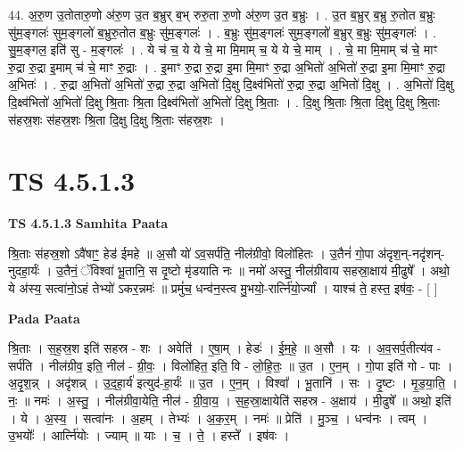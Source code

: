 \documentclass[17pt]{extarticle}
\begin{document}
44. अ॒रु॒ण उ॒तोतारु॒णो अ॑रु॒ण उ॒त ब॒भ्रुर् ब॒भ् रुरु॒ता रु॒णो अ॑रु॒ण उ॒त ब॒भ्रुः । . उ॒त ब॒भ्रुर् ब॒भ्रु रु॒तोत ब॒भ्रुः सु॑म॒ङ्गलः॑ सुम॒ङ्गलो॑ ब॒भ्रुरु॒तोत ब॒भ्रुः सु॑म॒ङ्गलः॑ । . ब॒भ्रुः सु॑म॒ङ्गलः॑ सुम॒ङ्गलो॑ ब॒भ्रुर् ब॒भ्रुः सु॑म॒ङ्गलः॑ । . सु॒म॒ङ्गल॒ इति॑ सु - म॒ङ्गलः॑ । . ये च॑ च॒ ये ये चे॒ मा मि॒माम् च॒ ये ये चे॒ माम् । . चे॒ मा मि॒माम् च॑ चे॒ माꣳ रु॒द्रा रु॒द्रा इ॒माम् च॑ चे॒ माꣳ रु॒द्राः । . इ॒माꣳ रु॒द्रा रु॒द्रा इ॒मा मि॒माꣳ रु॒द्रा अ॒भितो॑ अ॒भितो॑ रु॒द्रा इ॒मा मि॒माꣳ रु॒द्रा अ॒भितः॑ । . रु॒द्रा अ॒भितो॑ अ॒भितो॑ रु॒द्रा रु॒द्रा अ॒भितो॑ दि॒क्षु दि॒क्ष्व॑भितो॑ रु॒द्रा रु॒द्रा अ॒भितो॑ दि॒क्षु । . अ॒भितो॑ दि॒क्षु दि॒क्ष्व॑भितो॑ अ॒भितो॑ दि॒क्षु श्रि॒ताः श्रि॒ता दि॒क्ष्व॑भितो॑ अ॒भितो॑ दि॒क्षु श्रि॒ताः । . दि॒क्षु श्रि॒ताः श्रि॒ता दि॒क्षु दि॒क्षु श्रि॒ताः स॑हस्र॒शः स॑हस्र॒शः श्रि॒ता दि॒क्षु दि॒क्षु श्रि॒ताः स॑हस्र॒शः । \newline
\pagebreak
{}

\section{ TS 4.5.1.3 }

\textbf{TS 4.5.1.3 } \newline
\textbf{Samhita Paata} \newline

श्रि॒ताः स॑हस्र॒शो ऽवै॑षाꣳ॒॒ हेड॑ ईमहे ॥ अ॒सौ यो॑ ऽव॒सर्प॑ति॒ नील॑ग्रीवो॒ विलो॑हितः । उ॒तैनं॑ गो॒पा अ॑दृश॒न्-नदृ॑शन्-नुदहा॒र्यः॑ । उ॒तैनं॒ ॅविश्वा॑ भू॒तानि॒ स दृ॒ष्टो मृ॑डयाति नः ॥                               नमो॑ अस्तु॒ नील॑ग्रीवाय सहस्रा॒क्षाय॑ मी॒ढुषे᳚ । अथो॒ ये अ॑स्य॒ सत्वा॑नो॒ऽहं तेभ्यो॑ ऽकर॒न्नमः॑ ॥                                   प्रमुं॑च॒ धन्व॑न॒स्त्व मु॒भयो॒-रार्त्नि॑यो॒र्ज्यां । याश्च॑ ते॒ हस्त॒ इष॑वः॒ - [  ] \newline

\textbf{Pada Paata} \newline

श्रि॒ताः । स॒ह॒स्र॒श इति॑ सहस्र - शः । अवेति॑ । ए॒षा॒म् । हेडः॑ । ई॒म॒हे॒ ॥ अ॒सौ । यः । अ॒व॒सर्प॒तीत्य॑व - सर्प॑ति । नील॑ग्रीव॒ इति॒ नील॑ - ग्री॒वः॒ । विलो॑हित॒ इति॒ वि - लो॒हि॒तः॒ ॥ उ॒त । ए॒न॒म् । गो॒पा इति॑ गो - पाः । अ॒दृ॒श॒न्न् । अदृ॑शन्न् । उ॒द॒हा॒र्य॑ इत्युद॑-हा॒र्यः॑ ॥ उ॒त । ए॒न॒म् । विश्वा᳚ । भू॒तानि॑ । सः । दृ॒ष्टः । मृ॒ड॒या॒ति॒ । नः॒ ॥ नमः॑ । अ॒स्तु॒ । नील॑ग्रीवा॒येति॒ नील॑ - ग्री॒वा॒य॒ । स॒ह॒स्रा॒क्षायेति॑ सहस्र - अ॒क्षाय॑ । मी॒ढुषे᳚ ॥ अथो॒ इति॑ । ये । अ॒स्य॒ । सत्वा॑नः । अ॒हम् । तेभ्यः॑ । अ॒क॒र॒म् । नमः॑ ॥ प्रेति॑ । मु॒ञ्च॒ । धन्व॑नः । त्वम् । उ॒भयोः᳚ । आर्त्नि॑योः । ज्याम् ॥ याः । च॒ । ते॒ । हस्ते᳚ । इष॑वः ।  \newline
\end{document}
